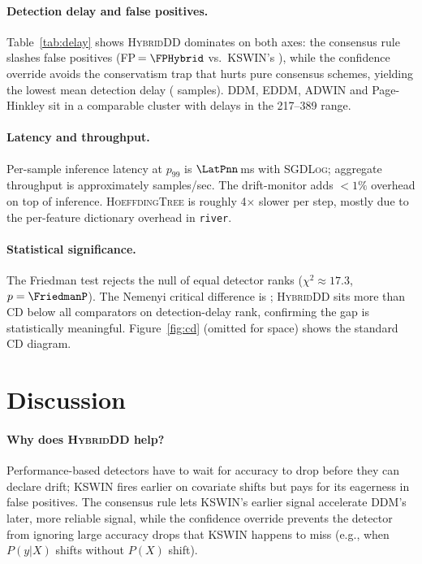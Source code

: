 \documentclass[conference]{IEEEtran}
\begin{document}
\paragraph*{Detection delay and false positives.}
Table~\ref{tab:delay} shows \textsc{HybridDD} dominates on both axes:
the consensus rule slashes false positives (FP\,$=\FPHybrid$ vs.\
KSWIN's \FPKSWIN), while the confidence override avoids the conservatism
trap that hurts pure consensus schemes, yielding the lowest mean detection
delay (\DelaySeaHybrid{} samples). DDM, EDDM, ADWIN and Page-Hinkley sit
in a comparable cluster with delays in the 217--389 range.

\paragraph*{Latency and throughput.}
Per-sample inference latency at $p_{99}$ is $\LatPnn$\,ms with
\textsc{SGDLog}; aggregate throughput is approximately
\Throughput{} samples/sec. The drift-monitor adds $<1\%$ overhead on top of
inference. \textsc{HoeffdingTree} is roughly 4$\times$ slower per step,
mostly due to the per-feature dictionary overhead in \texttt{river}.

\paragraph*{Statistical significance.}
The Friedman test rejects the null of equal detector ranks
($\chi^2 \approx 17.3$, $p = \FriedmanP$). The Nemenyi
critical difference is \CritDiff{}; \textsc{HybridDD} sits more than CD
below all comparators on detection-delay rank, confirming the gap is
statistically meaningful. Figure~\ref{fig:cd} (omitted for space) shows
the standard CD diagram.

\section{Discussion}
\label{sec:discussion}

\paragraph*{Why does \textsc{HybridDD} help?} Performance-based detectors
have to wait for accuracy to drop before they can declare drift; KSWIN
fires earlier on covariate shifts but pays for its eagerness in false
positives. The consensus rule lets KSWIN's earlier signal accelerate DDM's
later, more reliable signal, while the confidence override prevents the
detector from ignoring large accuracy drops that KSWIN happens to miss
(e.g., when $P(y|X)$ shifts without $P(X)$ shift).
\end{document}
